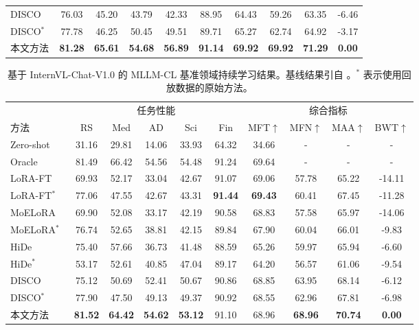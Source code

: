 \begin{table}[!htbp]
\begin{tabular}{lccccccccc}
DISCO~\citep{guo2025federated} & 76.03 & 45.20 & 43.79 & 42.33 & 88.95 & 64.43 & 59.26 & 63.35 & -6.46 \\
DISCO$^*$~\citep{guo2025federated} & 77.78 & 46.25 & 50.45 & 49.51 & 89.71 & 65.27 & 62.74 & 64.92 & -3.17 \\
\midrule
\rowcolor{Light}本文方法 & \textbf{81.28} & \textbf{65.61} & \textbf{54.68} & \textbf{56.89} & \textbf{91.14} & \textbf{69.92} & \textbf{69.92} & \textbf{71.29} & \textbf{0.00} \\
\bottomrule
\end{tabular}
\label{tab:llavaDCL}
\end{table}

\begin{table}[!htbp]
    \centering
    \setlength{\tabcolsep}{5pt}
    \caption{基于 InternVL-Chat-V1.0 的 MLLM-CL 基准领域持续学习结果。基线结果引自 \citep{zhao2025mllm}。$^*$ 表示使用回放数据的原始方法。}
    \renewcommand{\arraystretch}{1.1}
\begin{tabular}{lccccccccc}
\toprule
& \multicolumn{5}{c}{任务性能} & \multicolumn{4}{c}{综合指标} \\
\cmidrule(lr){2-6} \cmidrule(lr){7-10}
方法     & RS      & Med      & AD     & Sci       & Fin      & MFT$\uparrow$ & MFN$\uparrow$ & MAA$\uparrow$ & BWT$\uparrow$ \\
\midrule
Zero-shot                            & 31.16 & 29.81 & 14.06 & 33.93 & 64.32 & 34.66 & -     & -     & -      \\
Oracle                              & 81.49 & 66.42 & 54.56 & 54.48 & 91.24 & {69.64} & -     & -     & -      \\
\midrule
LoRA-FT~\citep{hu2021lora} & 69.93 & 52.17 & 33.04 & 42.67 & 91.07 & 69.06 & 57.78 & 65.22 & -14.11 \\
LoRA-FT$^*$~\citep{hu2021lora} & 77.06 & 47.55 & 42.67 & 43.31 & \textbf{91.44} & \textbf{69.43} & 60.41 & 67.45 & -11.28 \\
MoELoRA~\citep{chen2024coin} & 69.90 & 52.08 & 33.17 & 42.19 & 90.58 & 68.83 & 57.58 & 65.97 & -14.06 \\
MoELoRA$^*$~\citep{chen2024coin} & 76.74 & 52.65 & 38.81 & 42.15 & 89.84 & 67.90 & 60.04 & 66.01 & -9.83 \\
HiDe~\citep{guo2025hide} & 75.40 & 57.66 & 36.73 & 41.48 & 88.59 & 65.26 & 59.97 & 65.94 & -6.60 \\
HiDe$^*$~\citep{guo2025hide} & 53.17 & 52.61 & 40.85 & 47.04 & 89.17 & 64.20 & 56.57 & 61.06 & -9.54 \\
DISCO~\citep{guo2025federated} & 75.12 & 50.69 & 52.41 & 50.67 & 90.86 & 68.85 & 63.95 & 68.14 & -6.12 \\
DISCO$^*$~\citep{guo2025federated} & 77.90 & 47.50 & 49.13 & 49.37 & 90.92 & 68.55 & 62.96 & 67.81 & -6.98 \\
\midrule
\rowcolor{Light}本文方法 & \textbf{81.52} & \textbf{64.42} & \textbf{54.62} & \textbf{53.12} & 91.10 & 68.96 & \textbf{68.96} & \textbf{70.74} & \textbf{0.00} \\
\bottomrule
\end{tabular}
\label{tab:internvlDCL}
\end{table}

